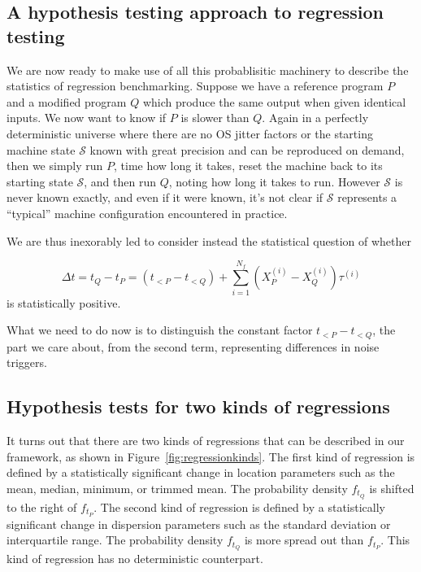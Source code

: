 \documentclass[conference]{IEEEtran}
\begin{document}
\subsection{A hypothesis testing approach to regression testing}

We are now ready to make use of all this probablisitic machinery to describe the statistics of regression benchmarking. Suppose we have a reference program $P$ and a modified program $Q$ which produce the same output when given identical inputs. We now want to know if $P$ is slower than $Q$. Again in a perfectly deterministic universe where there are no OS jitter factors or the starting machine state $\mathcal S$ known with great precision and can be reproduced on demand, then we simply run $P$, time how long it takes, reset the machine back to its starting state $\mathcal S$, and then run $Q$, noting how long it takes to run. However $\mathcal S$ is never known exactly, and even if it were known, it's not clear if
$\mathcal S$ represents a ``typical'' machine configuration encountered in practice.

We are thus inexorably led to consider instead the statistical question of whether

\begin{equation}
\Delta t = t_Q - t_P
= (t_{<P} - t_{<Q}) + \sum_{i=1}^{N_f} (X^{(i)}_P - X^{(i)}_Q) \tau^{(i)}
\end{equation}
%
is statistically positive.

What we need to do now is to distinguish the constant factor $t_{<P} - t_{<Q}$, the part we care about, from the second term, representing differences in noise triggers.


\subsection{Hypothesis tests for two kinds of regressions}

It turns out that there are two kinds of regressions that can be described in our framework, as shown in Figure~\ref{fig:regressionkinds}. The first kind of regression is defined by a statistically significant change in location parameters such as the mean, median, minimum, or trimmed mean. The probability density $f_{t_Q}$ is shifted to the right of $f_{t_P}$. The second kind of regression is defined by a statistically significant change in dispersion parameters such as the standard deviation or interquartile range. The probability density $f_{t_Q}$ is more spread out than $f_{t_P}$. This kind of regression has no deterministic counterpart.
\end{document}
